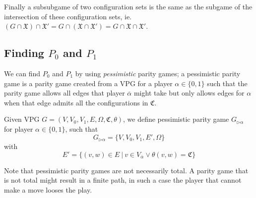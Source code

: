 Finally a subsubgame of two configuration sets is the same as the subgame of the intersection of these configuration sets, ie. $(G \cap \mathfrak{X}) \cap \mathfrak{X}' = G \cap (\mathfrak{X} \cap \mathfrak{X}') = G \cap \mathfrak{X} \cap \mathfrak{X}'$.

\subsection{Finding $P_0$ and $P_1$}
We can find $P_0$ and $P_1$ by using \textit{pessimistic} parity games; a pessimistic parity game is a parity game created from a VPG for a player $\alpha \in \{0,1\}$ such that the parity game allows all edges that player $\overline{\alpha}$ might take but only allows edges for $\alpha$ when that edge admits all the configurations in $\mathfrak{C}$.
\begin{definition}
	\label{def_pess_game}
	Given VPG $G = (V,V_0,V_1,E,\Omega, \mathfrak{C},\theta)$, we define pessimistic parity game $G_{\triangleright\alpha}$ for player $\alpha \in \{0,1\}$, such that
	\[ G_{\triangleright\alpha} = \{V,V_0,V_1,E',\Omega \} \]
	with
	\[ E' = \{ (v,w) \in E\ |\ v \in V_{\overline{\alpha}} \vee \theta(v,w) = \mathfrak{C} \} \]
\end{definition}


Note that pessimistic parity games are not necessarily total. A parity game that is not total might result in a finite path, in such a case the player that cannot make a move looses the play.

